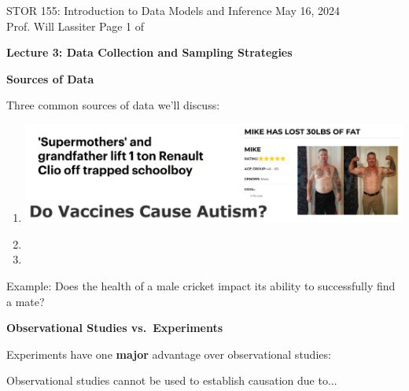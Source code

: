 \documentclass[11pt,letterpaper,twoside]{article}
\newcommand{\whatizit}{Lecture 3: Data Collection and Sampling Strategies}
\begin{document}
\thispagestyle{empty} \vspace*{-0.75in}

{\bssten STOR 155: Introduction to Data Models and Inference \hfill May 16, 2024 \\
Prof. Will Lassiter  \hfill Page 1 of \pageref{totalpag}}
\vspace{10pt}
\begin{center} {{\Large \bf \whatizit}} \end{center}

{\bf Sources of Data} \vspace{6pt}

Three common sources of data we'll discuss:

\begin{enumerate}

\item \quad \vspace{40pt}

\begin{center}
\includegraphics[scale=0.7]{images/anecdotal.png}
\end{center}

\item \quad \vspace{60pt}

\item \quad \vspace{60pt}

\end{enumerate}

Example: Does the health of a male cricket impact its ability to successfully find a mate? \vspace{100pt}

\newpage

{\bf Observational Studies vs.\ Experiments} \vspace{6pt}

Experiments have one {\bf major} advantage over observational studies: \vspace{120pt}


Observational studies cannot be used to establish causation due to... \vspace{120pt}
\end{document}
